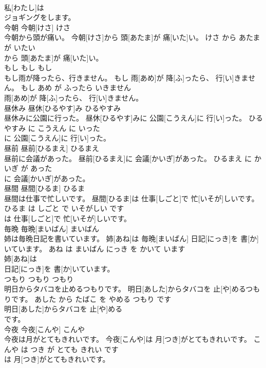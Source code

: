 \documentclass[8pt]{extreport}
\begin{document}
\begin{CJK}{UTF8}{min}
\\	私[わたし]は
\\	ジョギングをします。		
\\	今朝	今朝[けさ]	けさ	
\\	今朝から頭が痛い。	今朝[けさ]から 頭[あたま]が 痛[いた]い。	けさ から あたま が いたい	
\\	から 頭[あたま]が 痛[いた]い。		
\\	もし	もし	もし	
\\	もし雨が降ったら、行きません。	もし 雨[あめ]が 降[ふ]ったら、 行[い]きません。	もし あめ が ふったら いきません	
\\	雨[あめ]が 降[ふ]ったら、 行[い]きません。		
\\	昼休み	昼休[ひるやす]み	ひるやすみ	
\\	昼休みに公園に行った。	昼休[ひるやす]みに 公園[こうえん]に 行[い]った。	ひるやすみ に こうえん に いった	
\\	に 公園[こうえん]に 行[い]った。		
\\	昼前	昼前[ひるまえ]	ひるまえ	
\\	昼前に会議があった。	昼前[ひるまえ]に 会議[かいぎ]があった。	ひるまえ に かいぎ が あった	
\\	に 会議[かいぎ]があった。		
\\	昼間	昼間[ひるま]	ひるま	
\\	昼間は仕事で忙しいです。	昼間[ひるま]は 仕事[しごと]で 忙[いそが]しいです。	ひるま は しごと で いそがしい です	
\\	は 仕事[しごと]で 忙[いそが]しいです。		
\\	毎晩	毎晩[まいばん]	まいばん	
\\	姉は毎晩日記を書いています。	姉[あね]は 毎晩[まいばん] 日記[にっき]を 書[か]いています。	あね は まいばん にっき を かいて います	
\\	姉[あね]は
\\	日記[にっき]を 書[か]いています。		
\\	つもり	つもり	つもり	
\\	明日からタバコを止めるつもりです。	明日[あした]からタバコを 止[や]めるつもりです。	あした から たばこ を やめる つもり です	
\\	明日[あした]からタバコを 止[や]める
\\	です。		
\\	今夜	今夜[こんや]	こんや	
\\	今夜は月がとてもきれいです。	今夜[こんや]は 月[つき]がとてもきれいです。	こんや は つき が とても きれい です	
\\	は 月[つき]がとてもきれいです。		

\end{CJK}
\end{document}
